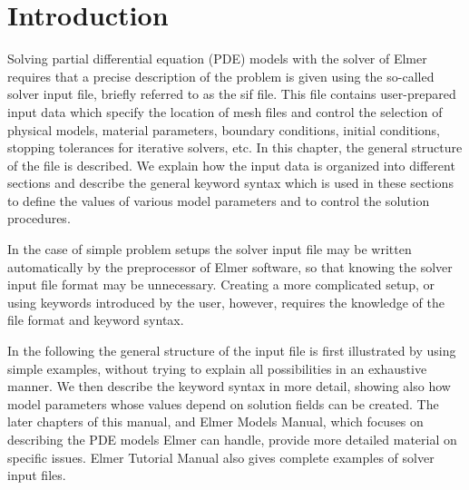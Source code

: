 \begin{versiona}
\end{versiona}
\noindent
                                                                                                                 
\section{Introduction}

Solving partial differential equation (PDE) models with the solver of Elmer
requires that a precise description of the problem is given using 
the so-called solver input file, briefly referred to as the sif file. 
This file contains user-prepared input data which specify the location of mesh files and 
control the selection of physical models, material parameters, boundary conditions, 
initial conditions, stopping tolerances for iterative solvers, etc. 
In this chapter, the general structure of the file is described. We explain
how the input data is organized into different sections and describe the general keyword syntax 
which is used in these sections to define the values of various model parameters and to control
the solution procedures.

In the case of simple problem setups the solver input file may be written automatically by 
the preprocessor of Elmer software, so that knowing the solver input file format may be unnecessary.
Creating a more complicated setup, or using keywords introduced by the user, however, requires 
the knowledge of the file format and keyword syntax. 

In the following the general structure of the input file is first illustrated by using simple examples,
without trying to explain all possibilities in an exhaustive manner.
We then describe the keyword syntax in more detail, showing also how model parameters 
whose values depend on solution fields can be created. The later chapters of this manual, 
and Elmer Models Manual, which focuses on describing the PDE models Elmer can handle, provide more
detailed material on specific issues. Elmer Tutorial Manual also gives complete
examples of solver input files.



